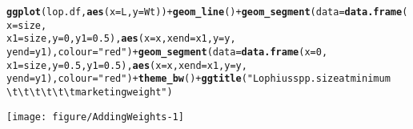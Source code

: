\documentclass[12pt]{article}\usepackage[]{graphicx}\usepackage[]{color}
\makeatletter
\def\maxwidth{ %
  \ifdim\Gin@nat@width>\linewidth
    \linewidth
  \else
    \Gin@nat@width
  \fi
}
\newcommand{\hlnum}[1]{\textcolor[rgb]{0.686,0.059,0.569}{#1}}%
\newcommand{\hlstr}[1]{\textcolor[rgb]{0.192,0.494,0.8}{#1}}%
\newcommand{\hlopt}[1]{\textcolor[rgb]{0,0,0}{#1}}%
\newcommand{\hlstd}[1]{\textcolor[rgb]{0.345,0.345,0.345}{#1}}%
\newcommand{\hlkwc}[1]{\textcolor[rgb]{0.333,0.667,0.333}{#1}}%
\newcommand{\hlkwd}[1]{\textcolor[rgb]{0.737,0.353,0.396}{\textbf{#1}}}%
\newenvironment{kframe}{%
 \def\at@end@of@kframe{}%
 \ifinner\ifhmode%
  \def\at@end@of@kframe{\end{minipage}}%
  \begin{minipage}{\columnwidth}%
 \fi\fi%
 \def\FrameCommand##1{\hskip\@totalleftmargin \hskip-\fboxsep
 \colorbox{shadecolor}{##1}\hskip-\fboxsep
     \hskip-\linewidth \hskip-\@totalleftmargin \hskip\columnwidth}%
 \MakeFramed {\advance\hsize-\width
   \@totalleftmargin\z@ \linewidth\hsize
   \@setminipage}}%
 {\par\unskip\endMakeFramed%
 \at@end@of@kframe}
\newenvironment{knitrout}{}{} %
\makeatother
\begin{document}
\begin{knitrout}
\begin{kframe}
\begin{alltt}
\hlkwd{ggplot}\hlstd{(lop.df,} \hlkwd{aes}\hlstd{(}\hlkwc{x} \hlstd{= L,} \hlkwc{y} \hlstd{= Wt))} \hlopt{+} \hlkwd{geom_line}\hlstd{()} \hlopt{+} \hlkwd{geom_segment}\hlstd{(}\hlkwc{data} \hlstd{=} \hlkwd{data.frame}\hlstd{(}\hlkwc{x} \hlstd{= size,}
    \hlkwc{x1} \hlstd{= size,} \hlkwc{y} \hlstd{=} \hlnum{0}\hlstd{,} \hlkwc{y1} \hlstd{=} \hlnum{0.5}\hlstd{),} \hlkwd{aes}\hlstd{(}\hlkwc{x} \hlstd{= x,} \hlkwc{xend} \hlstd{= x1,} \hlkwc{y} \hlstd{= y,}
    \hlkwc{yend} \hlstd{= y1),} \hlkwc{colour} \hlstd{=} \hlstr{"red"}\hlstd{)} \hlopt{+} \hlkwd{geom_segment}\hlstd{(}\hlkwc{data} \hlstd{=} \hlkwd{data.frame}\hlstd{(}\hlkwc{x} \hlstd{=} \hlnum{0}\hlstd{,}
    \hlkwc{x1} \hlstd{= size,} \hlkwc{y} \hlstd{=} \hlnum{0.5}\hlstd{,} \hlkwc{y1} \hlstd{=} \hlnum{0.5}\hlstd{),} \hlkwd{aes}\hlstd{(}\hlkwc{x} \hlstd{= x,} \hlkwc{xend} \hlstd{= x1,} \hlkwc{y} \hlstd{= y,}
    \hlkwc{yend} \hlstd{= y1),} \hlkwc{colour} \hlstd{=} \hlstr{"red"}\hlstd{)} \hlopt{+} \hlkwd{theme_bw}\hlstd{()} \hlopt{+} \hlkwd{ggtitle}\hlstd{(}\hlstr{"Lophius spp. size at minimum
\textbackslash{}t\textbackslash{}t\textbackslash{}t\textbackslash{}t\textbackslash{}t\textbackslash{}t  marketing weight"}\hlstd{)}
\end{alltt}
\end{kframe}

{\centering \texttt{[image: figure/AddingWeights-1]} 

}



\end{knitrout}
\end{document}
